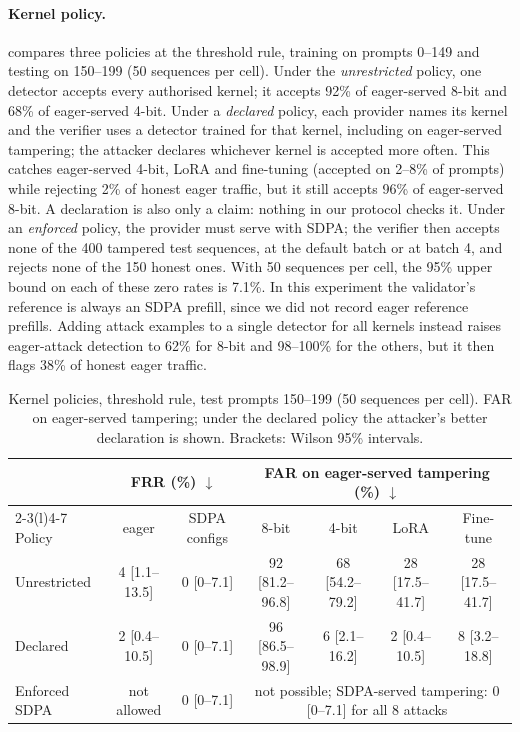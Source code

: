 \documentclass[10pt,twocolumn]{article}
\newcommand{\down}{$\downarrow$}
\newcommand{\ci}[2]{{\scriptsize[#1--#2]}}
\begin{document}
\paragraph{Kernel policy.}
 compares three policies at the threshold rule, training on prompts 0--149 and testing on 150--199 (50 sequences per cell).
Under the \emph{unrestricted} policy, one detector accepts every authorised kernel; it accepts 92\% of eager-served 8-bit and 68\% of eager-served 4-bit.
Under a \emph{declared} policy, each provider names its kernel and the verifier uses a detector trained for that kernel, including on eager-served tampering; the attacker declares whichever kernel is accepted more often.
This catches eager-served 4-bit, LoRA and fine-tuning (accepted on 2--8\% of prompts) while rejecting 2\% of honest eager traffic, but it still accepts 96\% of eager-served 8-bit.
A declaration is also only a claim: nothing in our protocol checks it.
Under an \emph{enforced} policy, the provider must serve with SDPA; the verifier then accepts none of the 400 tampered test sequences, at the default batch or at batch 4, and rejects none of the 150 honest ones.
With 50 sequences per cell, the 95\% upper bound on each of these zero rates is 7.1\%.
In this experiment the validator's reference is always an SDPA prefill, since we did not record eager reference prefills.
Adding attack examples to a single detector for all kernels instead raises eager-attack detection to 62\% for 8-bit and 98--100\% for the others, but it then flags 38\% of honest eager traffic.

\begin{table}[!t]
\centering
\small
\caption{Kernel policies, threshold rule, test prompts 150--199 (50 sequences per cell). FAR on eager-served tampering; under the declared policy the attacker's better declaration is shown. Brackets: Wilson 95\% intervals.}
\label{tab:policy}
\begin{tabular}{@{}lcccccc@{}}
\toprule
 & \multicolumn{2}{c}{FRR (\%) \down} & \multicolumn{4}{c}{FAR on eager-served tampering (\%) \down} \\
\cmidrule(lr){2-3}\cmidrule(l){4-7}
Policy & eager & SDPA configs & 8-bit & 4-bit & LoRA & Fine-tune \\
\midrule
Unrestricted & 4 \ci{1.1}{13.5} & 0 \ci{0}{7.1} & 92 \ci{81.2}{96.8} & 68 \ci{54.2}{79.2} & 28 \ci{17.5}{41.7} & 28 \ci{17.5}{41.7} \\
Declared     & 2 \ci{0.4}{10.5} & 0 \ci{0}{7.1} & 96 \ci{86.5}{98.9} & 6 \ci{2.1}{16.2} & 2 \ci{0.4}{10.5} & 8 \ci{3.2}{18.8} \\
Enforced SDPA & not allowed & 0 \ci{0}{7.1} & \multicolumn{4}{c}{not possible; SDPA-served tampering: 0 \ci{0}{7.1} for all 8 attacks} \\
\bottomrule
\end{tabular}
\end{table}
\end{document}
